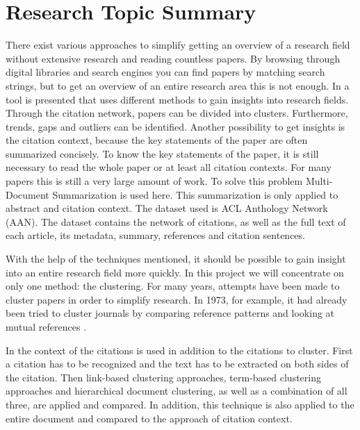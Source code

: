\section{Research Topic Summary}
There exist various approaches to simplify getting an overview of a research field without extensive research and reading countless papers. By browsing through digital libraries and search engines you can find papers by matching search strings, but to get an overview of an entire research area this is not enough.
In \cite{Rapid_understanding_of_scientific_paper_collections} a tool is presented that uses different methods to gain insights into research fields.
Through the citation network, papers can be divided into clusters. Furthermore, trends, gaps and outliers can be identified.
Another possibility to get insights is the citation context, because the key statements of the paper are often summarized concisely. To know the key statements of the paper, it is still necessary to read the whole paper or at least all citation contexts. For many papers this is still a very large amount of work. To solve this problem Multi-Document Summarization is used here. This summarization is only applied to abstract and citation context. The dataset used is ACL Anthology Network (AAN).\cite{aan} The dataset contains the network of citations, as well as the full text of each article, its metadata, summary, references and citation sentences. 

With the help of the techniques mentioned, it should be possible to gain insight into an entire research field more quickly.
In this project we will concentrate on only one method: the clustering.
For many years, attempts have been made to cluster papers in order to simplify research. In 1973, for example, it had already been tried to cluster journals by comparing reference patterns and looking at mutual references \cite{Clustering_of_scientific_journals}.

In \cite{Document_clustering_of_scientific_texts_using_citation_contexts} the context of the citations is used in addition to the citations to cluster.
First a citation has to be recognized and the text has to be extracted on both sides of the citation. Then link-based clustering approaches, term-based clustering approaches and hierarchical document clustering, as well as a combination of all three, are applied and compared. In addition, this technique is also applied to the entire document and compared to the approach of citation context.

